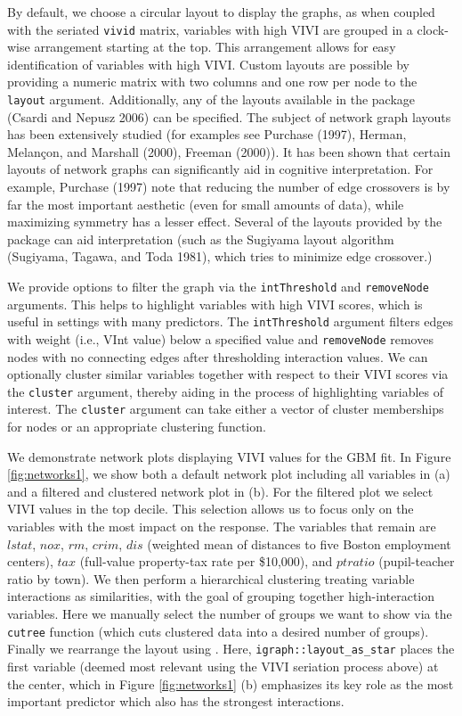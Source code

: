 By default, we choose a circular layout to display the graphs, as when coupled with the seriated \texttt{vivid} matrix, variables with high VIVI are grouped in a clock-wise arrangement starting at the top. This arrangement allows for easy identification of variables with high VIVI. Custom layouts are possible by providing a numeric matrix with two columns and one row per node to the \texttt{layout} argument. Additionally, any of the layouts available in the  package (Csardi and Nepusz 2006) can be specified. The subject of network graph layouts has been extensively studied (for examples see Purchase (1997), Herman, Melançon, and Marshall (2000), Freeman (2000)). It has been shown that certain layouts of network graphs can significantly aid in cognitive interpretation. For example, Purchase (1997) note that reducing the number of edge crossovers is by far the most important aesthetic (even for small amounts of data), while maximizing symmetry has a lesser effect. Several of the layouts provided by the  package can aid interpretation (such as the Sugiyama layout algorithm (Sugiyama, Tagawa, and Toda 1981), which tries to minimize edge crossover.)

We provide options to filter the graph via the \texttt{intThreshold} and \texttt{removeNode} arguments. This helps to highlight variables with high VIVI scores, which is useful in settings with many predictors. The \texttt{intThreshold} argument filters edges with weight (i.e., VInt value) below a specified value and \texttt{removeNode} removes nodes with no connecting edges after thresholding interaction values. We can optionally cluster similar variables together with respect to their VIVI scores via the \texttt{cluster} argument, thereby aiding in the process of highlighting variables of interest. The \texttt{cluster} argument can take either a vector of cluster memberships for nodes or an appropriate  clustering function.

We demonstrate network plots displaying VIVI values for the GBM fit. In Figure \ref{fig:networks1}, we show both a default network plot including all variables in (a) and a filtered and clustered network plot in (b). For the filtered plot we select VIVI values in the top decile. This selection allows us to focus only on the variables with the most impact on the response. The variables that remain are \(lstat\), \(nox\), \(rm\), \(crim\), \(dis\) (weighted mean of distances to five Boston employment centers), \(tax\) (full-value property-tax rate per \$10,000), and \(ptratio\) (pupil-teacher ratio by town). We then perform a hierarchical clustering treating variable interactions as similarities, with the goal of grouping together high-interaction variables. Here we manually select the number of groups we want to show via the \texttt{cutree} function (which cuts clustered data into a desired number of groups). Finally we rearrange the layout using . Here, \texttt{igraph::layout\_as\_star} places the first variable (deemed most relevant using the VIVI seriation process above) at the center, which in Figure \ref{fig:networks1} (b) emphasizes its key role as the most important predictor which also has the strongest interactions.

